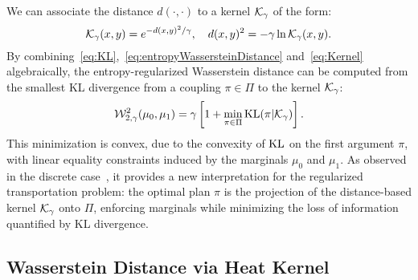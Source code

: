 We can associate the distance $d(\cdot,\cdot)$ to a kernel $\mathcal K_{\gamma}$ of the form:
\begin{equation}
\label{eq:Kernel}
\mathcal K_{\gamma}(x,y)  =  e^{-d(x,y)^2/\gamma}, \quad  d(x,y)^2  =  -\gamma\ln \mathcal K_{\gamma}(x,y).
\end{equation}
By combining~\eqref{eq:KL},~\eqref{eq:entropyWassersteinDistance} and~\eqref{eq:Kernel} algebraically, the entropy-regularized Wasserstein distance can be computed from
the smallest KL divergence from a coupling $\pi\in\Pi$ to the kernel $\mathcal K_\gamma$:
\begin{equation}
\label{eq:minKL}
\mathcal W^2_{2,\gamma}(\mu_0,\mu_1) = \gamma\left[1+\min_{\pi\in\Pi} \mathrm{KL}(\pi|\mathcal K_{\gamma})\right].
\end{equation}
This minimization is convex, due to the convexity of $\mathrm{KL}$ on the first argument $\pi$, with linear equality constraints induced by the marginals $\mu_0$ and $\mu_1$.  As observed in the discrete case~\cite{cuturi-2013,Benamou-IterBregman-2014}, it provides a new interpretation for the regularized transportation problem: the optimal plan $\pi$ is the projection of the distance-based kernel $\mathcal K_{\gamma}$ onto $\Pi$, enforcing marginals while minimizing the loss of information quantified by KL divergence.%

\subsection{Wasserstein Distance via Heat Kernel}

